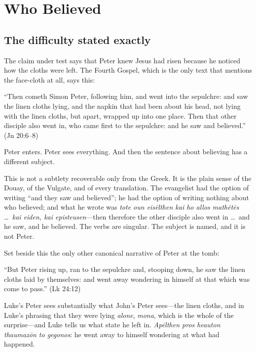 \section{Who Believed}

\subsection{The difficulty stated exactly}

The claim under test says that Peter knew Jesus had risen because he noticed
how the cloths were left. The Fourth Gospel, which is the only text that
mentions the face-cloth at all, says this:

\begin{studyframe}\small
``Then cometh Simon Peter, following him, and went into the sepulchre: and saw
the linen cloths lying, and the napkin that had been about his head, not lying
with the linen cloths, but apart, wrapped up into one place. Then that other
disciple also went in, who came first to the sepulchre: and he saw and
believed.'' (Jn 20:6--8)
\end{studyframe}

Peter enters. Peter sees everything. And then the sentence about believing has
a different subject.

This is not a subtlety recoverable only from the Greek. It is the plain sense
of the Douay, of the Vulgate, and of every translation. The evangelist had the
option of writing ``and they saw and believed''; he had the option of writing
nothing about who believed; and what he wrote was \emph{tote oun eis\=elthen
kai ho allos math\=et\=es \ldots\ kai eiden, kai episteusen}---then therefore
the other disciple also went in \ldots\ and he saw, and he believed. The verbs
are singular. The subject is named, and it is not Peter.

Set beside this the only other canonical narrative of Peter at the tomb:

\begin{studyframe}\small
``But Peter rising up, ran to the sepulchre and, stooping down, he saw the
linen cloths laid by themselves: and went away wondering in himself at that
which was come to pass.'' (Lk 24:12)
\end{studyframe}

Luke's Peter sees substantially what John's Peter sees---the linen cloths, and
in Luke's phrasing that they were lying \emph{alone}, \emph{mona}, which is
the whole of the surprise---and Luke tells us what state he left in.
\emph{Ap\=elthen pros heauton thaumaz\=on to gegonos}: he went away to himself
wondering at what had happened.


